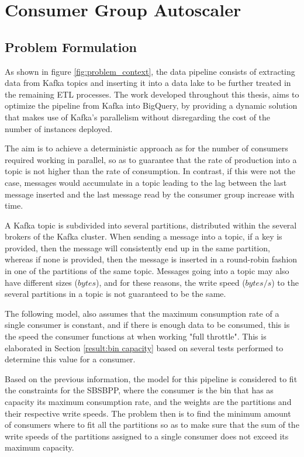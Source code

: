 \chapter{Consumer Group Autoscaler} 
\label{chap:consumer_group_autoscaler}

\section{Problem Formulation}

As shown in figure \ref{fig:problem_context}, the data pipeline consists of
extracting data from Kafka topics and inserting it into a data lake to be
further treated in the remaining ETL processes.  The work developed throughout
this thesis, aims to optimize the pipeline from Kafka into BigQuery, by
providing a dynamic solution that makes use of Kafka's parallelism without
disregarding the cost of the number of instances deployed. 

The aim is to achieve a deterministic approach as for the number of consumers
required working in parallel, so as to guarantee that the rate of production
into a topic is not higher than the rate of consumption. In contrast, if this
were not the case, messages would accumulate in a topic leading to the lag
between the last message inserted and the last message read by the consumer
group increase with time.

A Kafka topic is subdivided into several partitions, distributed within the
several brokers of the Kafka cluster. When sending a message into a topic, if a
key is provided, then the message will consistently end up in the same
partition, whereas if none is provided, then the message is inserted in a
round-robin fashion in one of the partitions of the same topic. Messages going
into a topic may also have different sizes ($bytes$), and for these reasons, the
write speed ($bytes/s$) to the several partitions in a topic is not guaranteed
to be the same. 

The following model, also assumes that the maximum consumption rate of a single
consumer is constant, and if there is enough data to be consumed, this is the
speed the consumer functions at when working "full throttle". This is
elaborated in Section \ref{result:bin capacity} based on several tests performed
to determine this value for a consumer. 

Based on the previous information, the model for this pipeline is considered to
fit the constraints for the SBSBPP, where the consumer is the bin that has as
capacity its maximum consumption rate, and the weights are the partitions and
their respective write speeds. The problem then is to find the minimum amount of
consumers where to fit all the partitions so as to make sure that the sum of the
write speeds of the partitions assigned to a single consumer does not exceed its
maximum capacity. 

